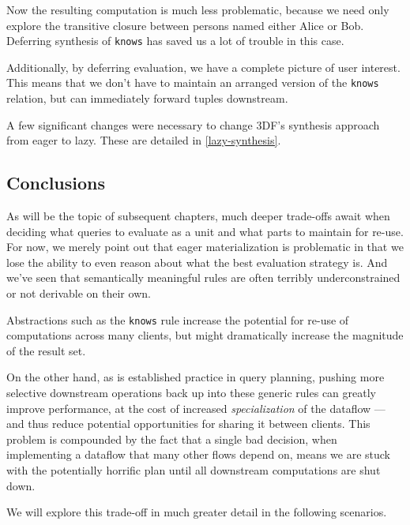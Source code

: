 \documentclass[../catalog.tex]{subfiles}
\begin{document}
Now the resulting computation is much less problematic, because we
need only explore the transitive closure between persons named either
Alice or Bob. Deferring synthesis of \texttt{knows} has saved us a lot
of trouble in this case.

Additionally, by deferring evaluation, we have a complete picture of
user interest. This means that we don't have to maintain an arranged
version of the \texttt{knows} relation, but can immediately forward
tuples downstream.

A few significant changes were necessary to change 3DF's synthesis
approach from eager to lazy. These are detailed in
\ref{lazy-synthesis}.

\subsection{Conclusions}

As will be the topic of subsequent chapters, much deeper trade-offs
await when deciding what queries to evaluate as a unit and what parts
to maintain for re-use. For now, we merely point out that eager
materialization is problematic in that we lose the ability to even
reason about what the best evaluation strategy is. And we've seen that
semantically meaningful rules are often terribly underconstrained or
not derivable on their own.

Abstractions such as the \texttt{knows} rule increase the potential
for re-use of computations across many clients, but might dramatically
increase the magnitude of the result set.

On the other hand, as is established practice in query planning,
pushing more selective downstream operations back up into these
generic rules can greatly improve performance, at the cost of
increased \emph{specialization} of the dataflow — and thus reduce
potential opportunities for sharing it between clients. This problem
is compounded by the fact that a single bad decision, when
implementing a dataflow that many other flows depend on, means we are
stuck with the potentially horrific plan until all downstream
computations are shut down.

We will explore this trade-off in much greater detail in the following
scenarios.
\end{document}
